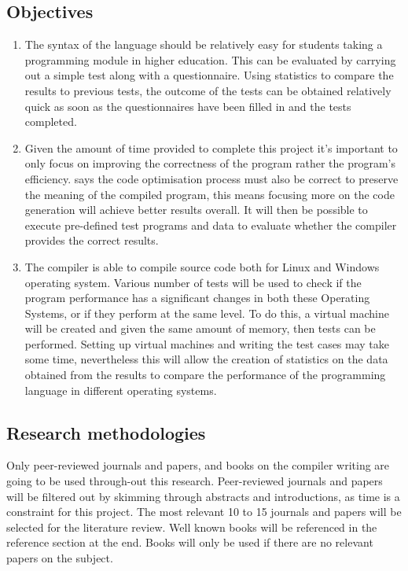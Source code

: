 \documentclass[a4paper]{article}
\begin{document}
\begin{appendices}
	\subsection{Objectives}
	\begin{enumerate}
		\item The syntax of the language should be relatively easy for students taking a programming module in higher education. This can be evaluated by carrying out a simple test along with a questionnaire. Using statistics to compare the results to previous tests, the outcome of the tests can be obtained relatively quick as soon as the questionnaires have been filled in and the tests completed.
		\item Given the amount of time provided to complete this project it's important to only focus on improving the correctness of the program rather the program's efficiency. \textcite{AhoLamSethiUllman2006} says the code optimisation process must also be correct to preserve the meaning of the compiled program, this means focusing more on the code generation will achieve better results overall. It will then be possible to execute pre-defined test programs and data to evaluate whether the compiler provides the correct results.
		\item The compiler is able to compile source code both for Linux and Windows operating system. Various number of tests will be used to check if the program performance has a significant changes in both these Operating Systems, or if they perform at the same level. To do this, a virtual machine will be created and given the same amount of memory, then tests can be performed. Setting up virtual machines and writing the test cases may take some time, nevertheless this will allow the creation of statistics on the data obtained from the results to compare the performance of the programming language in different operating systems.
	\end{enumerate}
	
	\subsection{Research methodologies}
	Only peer-reviewed journals and papers, and books on the compiler writing are going to be used through-out this research. Peer-reviewed journals and papers will be filtered out by skimming through abstracts and introductions, as time is a constraint for this project. The most relevant 10 to 15 journals and papers will be selected for the literature review. Well known books will be referenced in the reference section at the end. Books will only be used if there are no relevant papers on the subject.
	

\end{appendices}
\end{document}
